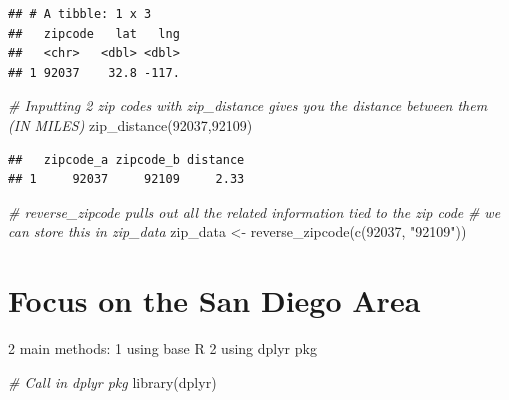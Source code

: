 \documentclass[
]{article}
\newenvironment{Shaded}{\begin{snugshade}}{\end{snugshade}}
\newcommand{\CommentTok}[1]{\textcolor[rgb]{0.56,0.35,0.01}{\textit{#1}}}
\newcommand{\FunctionTok}[1]{\textcolor[rgb]{0.00,0.00,0.00}{#1}}
\newcommand{\NormalTok}[1]{#1}
\newcommand{\OtherTok}[1]{\textcolor[rgb]{0.56,0.35,0.01}{#1}}
\newcommand{\SpecialCharTok}[1]{\textcolor[rgb]{0.00,0.00,0.00}{#1}}
\newcommand{\StringTok}[1]{\textcolor[rgb]{0.31,0.60,0.02}{#1}}
\begin{document}
\begin{verbatim}
## # A tibble: 1 x 3
##   zipcode   lat   lng
##   <chr>   <dbl> <dbl>
## 1 92037    32.8 -117.
\end{verbatim}

\begin{Shaded}
\begin{Highlighting}[]
\CommentTok{\# Inputting 2 zip codes with zip\_distance gives you the distance between them (IN MILES)}
\FunctionTok{zip\_distance}\NormalTok{(}\StringTok{\textquotesingle{}92037\textquotesingle{}}\NormalTok{,}\StringTok{\textquotesingle{}92109\textquotesingle{}}\NormalTok{)}
\end{Highlighting}
\end{Shaded}

\begin{verbatim}
##   zipcode_a zipcode_b distance
## 1     92037     92109     2.33
\end{verbatim}

\begin{Shaded}
\begin{Highlighting}[]
\CommentTok{\# reverse\_zipcode pulls out all the related information tied to the zip code}
\CommentTok{\# we can store this in zip\_data}
\NormalTok{zip\_data }\OtherTok{\textless{}{-}} \FunctionTok{reverse\_zipcode}\NormalTok{(}\FunctionTok{c}\NormalTok{(}\StringTok{\textquotesingle{}92037\textquotesingle{}}\NormalTok{, }\StringTok{"92109"}\NormalTok{))}
\end{Highlighting}
\end{Shaded}

\hypertarget{focus-on-the-san-diego-area}{%
\section{Focus on the San Diego
Area}\label{focus-on-the-san-diego-area}}

2 main methods: 1 using base R 2 using dplyr pkg

\begin{Shaded}
\end{Shaded}

\begin{Shaded}
\begin{Highlighting}[]
\CommentTok{\# Call in dplyr pkg}
\FunctionTok{library}\NormalTok{(dplyr)}
\end{Highlighting}
\end{Shaded}
\end{document}
